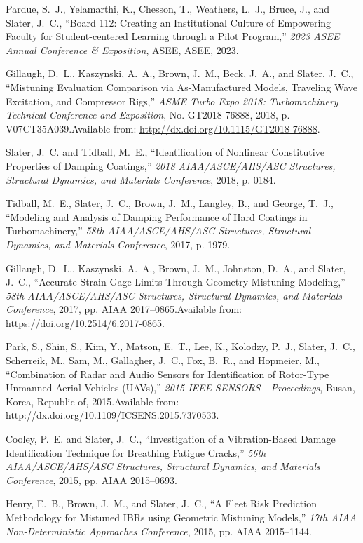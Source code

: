 Pardue, S.~J., Yelamarthi, K., Chesson, T., Weathers, L.~J., Bruce, J., and  Slater, J.~C., ``Board 112: Creating an Institutional Culture of  Empowering Faculty for Student-centered Learning through a Pilot Program,''  \emph{ 2023 ASEE Annual Conference \& Exposition\/}, ASEE, ASEE, 2023.

Gillaugh, D.~L., Kaszynski, A.~A., Brown, J.~M., Beck, J.~A., and Slater,  J.~C., ``Mistuning Evaluation Comparison via As-Manufactured Models,  Traveling Wave Excitation, and Compressor Rigs,'' \emph{ ASME Turbo Expo 2018:  Turbomachinery Technical Conference and Exposition\/}, No. GT2018-76888,  2018, p. V07CT35A039.\newblock Available from: \url{http://dx.doi.org/10.1115/GT2018-76888}.

Slater, J.~C. and Tidball, M.~E., ``Identification of Nonlinear  Constitutive Properties of Damping Coatings,'' \emph{ 2018 AIAA/ASCE/AHS/ASC  Structures, Structural Dynamics, and Materials Conference\/}, 2018, p. 0184.

Tidball, M.~E., Slater, J.~C., Brown, J.~M., Langley, B., and George, T.~J.,  ``Modeling and Analysis of Damping Performance of Hard Coatings in  Turbomachinery,'' \emph{ 58th AIAA/ASCE/AHS/ASC Structures, Structural Dynamics,  and Materials Conference\/}, 2017, p. 1979.

Gillaugh, D.~L., Kaszynski, A.~A., Brown, J.~M., Johnston, D.~A., and Slater,  J.~C., ``Accurate Strain Gage Limits Through Geometry Mistuning  Modeling,'' \emph{ 58th AIAA/\allowbreak ASCE/\allowbreak AHS/\allowbreak ASC  Structures, Structural Dynamics, and Materials Conference\/}, 2017, pp. AIAA  2017--0865.\newblock Available from: \url{https://doi.org/10.2514/6.2017-0865}.

Park, S., Shin, S., Kim, Y., Matson, E.~T., Lee, K., Kolodzy, P.~J., Slater,  J.~C., Scherreik, M., Sam, M., Gallagher, J.~C., Fox, B.~R., and Hopmeier,  M., ``Combination of Radar and Audio Sensors for Identification of  Rotor-Type Unmanned Aerial Vehicles (UAVs),'' \emph{ 2015 IEEE SENSORS -  Proceedings\/}, Busan, Korea, Republic of, 2015.\newblock Available from: \url{http://dx.doi.org/10.1109/ICSENS.2015.7370533}.

Cooley, P.~E. and Slater, J.~C., ``Investigation of a Vibration-Based  Damage Identification Technique for Breathing Fatigue Cracks,'' \emph{ 56th  AIAA/ASCE/AHS/ASC Structures, Structural Dynamics, and Materials  Conference\/}, 2015, pp. AIAA 2015--0693.

Henry, E.~B., Brown, J.~M., and Slater, J.~C., ``A Fleet Risk Prediction  Methodology for Mistuned IBRs using Geometric Mistuning Models,'' \emph{ 17th  AIAA Non-Deterministic Approaches Conference\/}, 2015, pp. AIAA 2015--1144.

